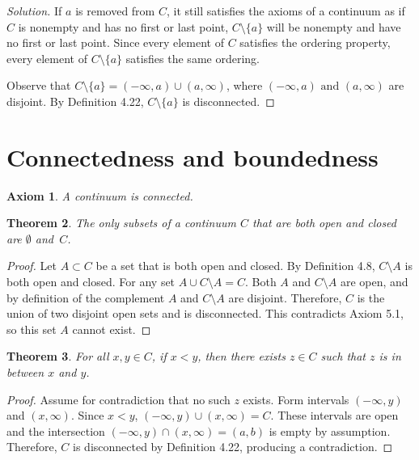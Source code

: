 \documentclass{amsart}
\newtheorem{theorem}{Theorem}
\newtheorem{axiom}[theorem]{Axiom}
\newcommand{\1}{\mathds{1}}
\numberwithin{equation}{section}
\numberwithin{theorem}{section}
\begin{document}
\begin{proof}[Solution]
	If $a$ is removed from $C$, it still satisfies the axioms of a continuum as if $C$ is nonempty and has no first or last point, $C\setminus \{a\}$ will be nonempty and have no first or last point. Since every element of $C$ satisfies the ordering property, every element of $C\setminus \{a\}$ satisfies the same ordering. 
	
	Observe that $C\setminus \{a\} = (-\infty, a) \cup (a,\infty)$, where $(-\infty, a) \text { and } (a,\infty)$ are disjoint. By Definition 4.22, $C\setminus \{a\}$ is disconnected. 
\end{proof}

\section{Connectedness and boundedness}


\begin{axiom}
A continuum is connected.
\end{axiom}

\begin{theorem}
The only subsets of a continuum $C$ that are both open and closed are $\emptyset$ and~$C$.
\end{theorem}

\begin{proof}
	Let $A\subset C$ be a set that is both open and closed. By Definition 4.8, $C\setminus A$ is both open and closed. For any set $A\cup C\setminus A = C$. Both $A$ and $C\setminus A$ are open, and by definition of the complement $A$ and  $C\setminus A$ are disjoint. Therefore, $C$ is the union of two disjoint open sets and is disconnected. This contradicts Axiom 5.1, so this set $A$ cannot exist. 
\end{proof}

\begin{theorem}
For all $x, y \in C$, if $x < y$, then there exists $z \in C$ such that $z$ is in between $x$ and $y$.
\end{theorem}

\begin{proof}
	Assume for contradiction that no such $z$ exists. Form intervals $(-\infty, y)$ and $(x,\infty)$. Since $x < y$, $(-\infty, y)\cup(x,\infty)=C$. These intervals are open and the intersection $(-\infty, y)\cap(x,\infty)= (a,b)$ is empty by assumption. Therefore, $C$ is disconnected by Definition 4.22, producing a contradiction. 
\end{proof}
\end{document}
